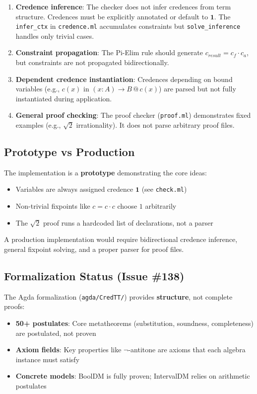 \documentclass[11pt,a4paper]{article}
\makeatletter
\newcommand{\at}[1]{\,@\,#1}
\newcommand{\one}{\mathbf{1}}
\newcommand{\negc}{\neg}
\makeatother
\begin{document}
\begin{enumerate}
    \item \textbf{Credence inference}: The checker does not infer credences from term structure. Credences must be explicitly annotated or default to $\one$. The \texttt{infer\_ctx} in \texttt{credence.ml} accumulates constraints but \texttt{solve\_inference} handles only trivial cases.
    \item \textbf{Constraint propagation}: The Pi-Elim rule should generate $c_{result} = c_f \cdot c_a$, but constraints are not propagated bidirectionally.
    \item \textbf{Dependent credence instantiation}: Credences depending on bound variables (e.g., $c(x)$ in $(x : A) \to B \at{c(x)}$) are parsed but not fully instantiated during application.
    \item \textbf{General proof checking}: The proof checker (\texttt{proof.ml}) demonstrates fixed examples (e.g., $\sqrt{2}$ irrationality). It does not parse arbitrary proof files.
\end{enumerate}

\subsection{Prototype vs Production}

The implementation is a \textbf{prototype} demonstrating the core ideas:
\begin{itemize}
    \item Variables are always assigned credence $\one$ (see \texttt{check.ml})
    \item Non-trivial fixpoints like $c = c \cdot c$ choose $1$ arbitrarily
    \item The $\sqrt{2}$ proof runs a hardcoded list of declarations, not a parser
\end{itemize}

A production implementation would require bidirectional credence inference, general fixpoint solving, and a proper parser for proof files.

\subsection{Formalization Status (Issue \#138)}

The Agda formalization (\texttt{agda/CredTT/}) provides \textbf{structure}, not complete proofs:

\begin{itemize}
    \item \textbf{50+ postulates}: Core metatheorems (substitution, soundness, completeness) are postulated, not proven
    \item \textbf{Axiom fields}: Key properties like $\negc$-antitone are axioms that each algebra instance must satisfy
    \item \textbf{Concrete models}: BoolDM is fully proven; IntervalDM relies on arithmetic postulates
\end{itemize}
\end{document}
